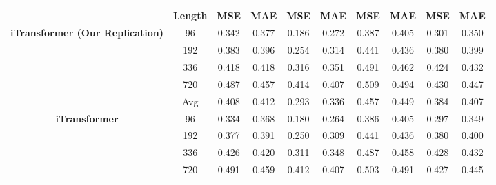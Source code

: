 \documentclass[twoside,12pt]{article}
\begin{document}
\begin{table}[htbp]
{\begin{small}
\begin{tabular}{c|c|cc|cc|cc|cc}
        \cmidrule(lr){3-4} \cmidrule(lr){5-6} \cmidrule(lr){7-8} \cmidrule(lr){9-10}
                                                                 & Length     & MSE                        & MAE                        & MSE                        & MAE                        & MSE   & MAE   & MSE   & MAE   \\
        \midrule
        \multirow{5}{*}{\textbf{iTransformer (Our Replication)}} & 96         & 0.342                      & 0.377                      & 0.186                      & 0.272                      & 0.387 & 0.405 & 0.301 & 0.350 \\
                                                                 & 192        & 0.383                      & 0.396                      & 0.254                      & 0.314                      & 0.441 & 0.436 & 0.380 & 0.399 \\
                                                                 & 336        & 0.418                      & 0.418                      & 0.316                      & 0.351                      & 0.491 & 0.462 & 0.424 & 0.432 \\
                                                                 & 720        & 0.487                      & 0.457                      & 0.414                      & 0.407                      & 0.509 & 0.494 & 0.430 & 0.447 \\
        \cmidrule(lr){2-10}
                                                                 & Avg        & 0.408                      & 0.412                      & 0.293                      & 0.336                      & 0.457 & 0.449 & 0.384 & 0.407 \\
        \midrule
        \multirow{5}{*}{\textbf{iTransformer}}                   & 96         & 0.334                      & 0.368                      & 0.180                      & 0.264                      & 0.386 & 0.405 & 0.297 & 0.349 \\
                                                                 & 192        & 0.377                      & 0.391                      & 0.250                      & 0.309                      & 0.441 & 0.436 & 0.380 & 0.400 \\
                                                                 & 336        & 0.426                      & 0.420                      & 0.311                      & 0.348                      & 0.487 & 0.458 & 0.428 & 0.432 \\
                                                                 & 720        & 0.491                      & 0.459                      & 0.412                      & 0.407                      & 0.503 & 0.491 & 0.427 & 0.445 \\

\end{tabular}
\end{small}}
\end{table}
\end{document}

